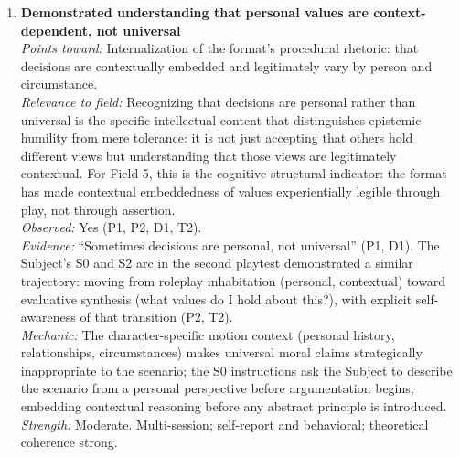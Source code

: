 \documentclass[12pt]{article}
\begin{document}
\begin{enumerate}
\textit{Mechanic:} The three-value motion structure assigns each team a value that is genuinely defensible for the character; the Subject's final synthesis requirement frames the question as ``what matters most to this person in this context'' rather than ``which position is objectively correct,'' making all three perspectives legitimate from the outset. The S0 speech institutionalises bias transparency rather than suppressing it, which makes epistemic humility structurally available rather than personally effortful.\\
\textit{Strength:} Moderate. Multi-session; self-report; directly on-target with design intent; P1 formulation notable for being unprompted; P2 debrief conversation particularly theoretically rich.

\item \textbf{Demonstrated understanding that personal values are context-dependent, not universal}\\
\textit{Points toward:} Internalization of the format's procedural rhetoric: that decisions are contextually embedded and legitimately vary by person and circumstance.\\
\textit{Relevance to field:} Recognizing that decisions are personal rather than universal is the specific intellectual content that distinguishes epistemic humility from mere tolerance: it is not just accepting that others hold different views but understanding that those views are legitimately contextual. For Field 5, this is the cognitive-structural indicator: the format has made contextual embeddedness of values experientially legible through play, not through assertion.\\
\textit{Observed:} Yes (P1, P2, D1, T2).\\
\textit{Evidence:} ``Sometimes decisions are personal, not universal'' (P1, D1). The Subject's S0 and S2 arc in the second playtest demonstrated a similar trajectory: moving from roleplay inhabitation (personal, contextual) toward evaluative synthesis (what values do I hold about this?), with explicit self-awareness of that transition (P2, T2).\\
\textit{Mechanic:} The character-specific motion context (personal history, relationships, circumstances) makes universal moral claims strategically inappropriate to the scenario; the S0 instructions ask the Subject to describe the scenario from a personal perspective before argumentation begins, embedding contextual reasoning before any abstract principle is introduced.\\
\textit{Strength:} Moderate. Multi-session; self-report and behavioral; theoretical coherence strong.


\end{enumerate}
\end{document}
